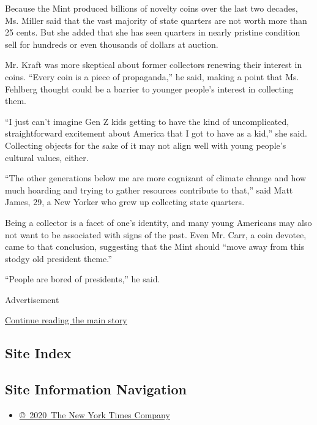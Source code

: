 Because the Mint produced billions of novelty coins over the last two
decades, Ms. Miller said that the vast majority of state quarters are
not worth more than 25 cents. But she added that she has seen quarters
in nearly pristine condition sell for hundreds or even thousands of
dollars at auction.

Mr. Kraft was more skeptical about former collectors renewing their
interest in coins. ``Every coin is a piece of propaganda,'' he said,
making a point that Ms. Fehlberg thought could be a barrier to younger
people's interest in collecting them.

``I just can't imagine Gen Z kids getting to have the kind of
uncomplicated, straightforward excitement about America that I got to
have as a kid,'' she said. Collecting objects for the sake of it may not
align well with young people's cultural values, either.

``The other generations below me are more cognizant of climate change
and how much hoarding and trying to gather resources contribute to
that,'' said Matt James, 29, a New Yorker who grew up collecting state
quarters.

Being a collector is a facet of one's identity, and many young Americans
may also not want to be associated with signs of the past. Even Mr.
Carr, a coin devotee, came to that conclusion, suggesting that the Mint
should ``move away from this stodgy old president theme.''

``People are bored of presidents,'' he said.

Advertisement

\protect\hyperlink{after-bottom}{Continue reading the main story}

\hypertarget{site-index}{%
\subsection{Site Index}\label{site-index}}

\hypertarget{site-information-navigation}{%
\subsection{Site Information
Navigation}\label{site-information-navigation}}

\begin{itemize}
\tightlist
\item
  \href{https://help.nytimes.com/hc/en-us/articles/115014792127-Copyright-notice}{©~2020~The
  New York Times Company}
\end{itemize}

